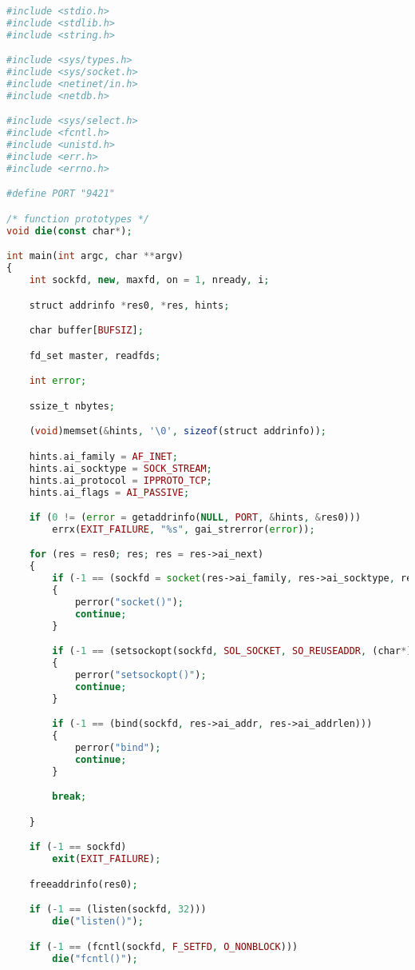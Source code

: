 \begin{lstlisting}[language=PHP]
#include <stdio.h>
#include <stdlib.h>
#include <string.h>

#include <sys/types.h>
#include <sys/socket.h>
#include <netinet/in.h>
#include <netdb.h>

#include <sys/select.h>
#include <fcntl.h>
#include <unistd.h>
#include <err.h>
#include <errno.h>

#define PORT "9421"

/* function prototypes */
void die(const char*);

int main(int argc, char **argv)
{
    int sockfd, new, maxfd, on = 1, nready, i;

    struct addrinfo *res0, *res, hints;

    char buffer[BUFSIZ];

    fd_set master, readfds;

    int error;

    ssize_t nbytes;

    (void)memset(&hints, '\0', sizeof(struct addrinfo));

    hints.ai_family = AF_INET;
    hints.ai_socktype = SOCK_STREAM;
    hints.ai_protocol = IPPROTO_TCP;
    hints.ai_flags = AI_PASSIVE;

    if (0 != (error = getaddrinfo(NULL, PORT, &hints, &res0)))
        errx(EXIT_FAILURE, "%s", gai_strerror(error));

    for (res = res0; res; res = res->ai_next)
    {
        if (-1 == (sockfd = socket(res->ai_family, res->ai_socktype, res->ai_protocol)))
        {
            perror("socket()");
            continue;
        }

        if (-1 == (setsockopt(sockfd, SOL_SOCKET, SO_REUSEADDR, (char*)&on, sizeof(int))))
        {
            perror("setsockopt()");
            continue;
        }

        if (-1 == (bind(sockfd, res->ai_addr, res->ai_addrlen)))
        {
            perror("bind");
            continue;
        }

        break;

    }

    if (-1 == sockfd)
        exit(EXIT_FAILURE);

    freeaddrinfo(res0);

    if (-1 == (listen(sockfd, 32)))
        die("listen()");

    if (-1 == (fcntl(sockfd, F_SETFD, O_NONBLOCK)))
        die("fcntl()");


\end{lstlisting}
